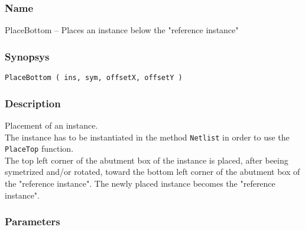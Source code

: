 \subsubsection{Name}

PlaceBottom -- Places an instance below the "reference instance"

\subsubsection{Synopsys}

\begin{verbatim}
PlaceBottom ( ins, sym, offsetX, offsetY )
\end{verbatim}

\subsubsection{Description}

Placement of an instance.\\
\indent The instance has to be instantiated in the method \verb-Netlist- in order to use the \verb-PlaceTop- function.\\
    
\indent The top left corner of the abutment box of the instance is placed, after beeing symetrized and/or rotated, toward the bottom left corner of the abutment box of the "reference instance". The newly placed instance becomes the "reference instance".

\subsubsection{Parameters}

